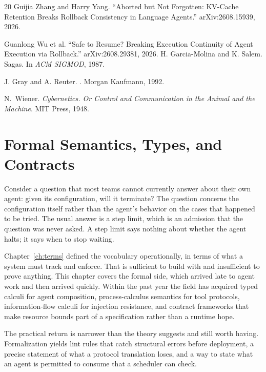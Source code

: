 \documentclass[11pt]{book}
\begin{document}
\begin{thebibliography}{20}
Guijia Zhang and Harry Yang.
``Aborted but Not Forgotten: KV-Cache Retention Breaks Rollback Consistency in Language Agents.''
arXiv:2608.15939, 2026.

Guanlong Wu et al.
``Safe to Resume? Breaking Execution Continuity of Agent Execution via Rollback.''
arXiv:2608.29381, 2026.
H. Garcia-Molina and K. Salem.
\newblock Sagas.
\newblock In {\em ACM SIGMOD}, 1987.

J. Gray and A. Reuter.
.
\newblock Morgan Kaufmann, 1992.

N.~Wiener.
\newblock \emph{Cybernetics. Or Control and Communication in the Animal and the Machine}.
\newblock MIT Press, 1948.

\end{thebibliography}
\chapter{Formal Semantics, Types, and Contracts}
\label{ch:semantics}

Consider a question that most teams cannot currently answer about their own agent: given its configuration, will it terminate? The question concerns the configuration itself rather than the agent's behavior on the cases that happened to be tried. The usual answer is a step limit, which is an admission that the question was never asked. A step limit says nothing about whether the agent halts; it says when to stop waiting.

Chapter~\ref{ch:terms} defined the vocabulary operationally, in terms of what a system must track and enforce. That is sufficient to build with and insufficient to prove anything. This chapter covers the formal side, which arrived late to agent work and then arrived quickly. Within the past year the field has acquired typed calculi for agent composition, process-calculus semantics for tool protocols, information-flow calculi for injection resistance, and contract frameworks that make resource bounds part of a specification rather than a runtime hope.

The practical return is narrower than the theory suggests and still worth having. Formalization yields lint rules that catch structural errors before deployment, a precise statement of what a protocol translation loses, and a way to state what an agent is permitted to consume that a scheduler can check.
\end{document}

